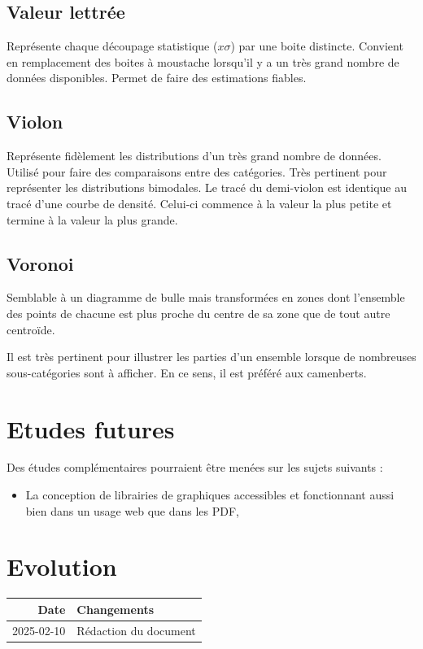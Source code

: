 \documentclass[a4paper,12pt]{article}
\begin{document}
\begin{multicols}{2}
\subsection*{Valeur lettrée}
\label{sec:org6a72935}
Représente chaque découpage statistique (\(x\sigma\)) par une boite distincte. Convient en remplacement des boites à moustache lorsqu'il y a un très grand nombre de données disponibles. Permet de faire des estimations fiables. \autocite{hofmannLettervaluePlotsBoxplots2017,mikeyiHowChooseRight2020}
\subsection*{Violon}
\label{sec:org13567f0}
Représente fidèlement les distributions d'un très grand nombre de données. \autocite{alansmithLexiqueVisuel} Utilisé pour faire des comparaisons entre des catégories. \autocite{mikeyiHowChooseRight2020}  Très pertinent pour représenter les distributions bimodales. \autocite{wilkeVisualizingManyDistributions2019} Le tracé du demi-violon est identique au tracé d'une courbe de densité. Celui-ci commence à la valeur la plus petite et termine à la valeur la plus grande.
\subsection*{Voronoi}
\label{sec:org5631575}
Semblable à un diagramme de bulle mais transformées en zones dont l'ensemble des points de chacune est plus proche du centre de sa zone que de tout autre centroïde. \autocite{alansmithLexiqueVisuel}

Il est très pertinent pour illustrer les parties d'un ensemble lorsque de nombreuses sous-catégories sont à afficher. \autocite{jonathanschwabishParttowhole2021} En ce sens, il est préféré aux camenberts.
\section*{Etudes futures}
\label{sec:orgc3fed52}
Des études complémentaires pourraient être menées sur les sujets suivants :
\begin{itemize}
\item La conception de librairies de graphiques accessibles et fonctionnant aussi bien dans un usage web que dans les PDF,
\end{itemize}
\section*{Evolution}
\label{sec:org1e07c0d}
\begin{center}
\begin{tabular}{rl}
Date & Changements\\
\hline
2025-02-10 & Rédaction du document\\
\end{tabular}
\end{center}

\end{multicols}
\end{document}

